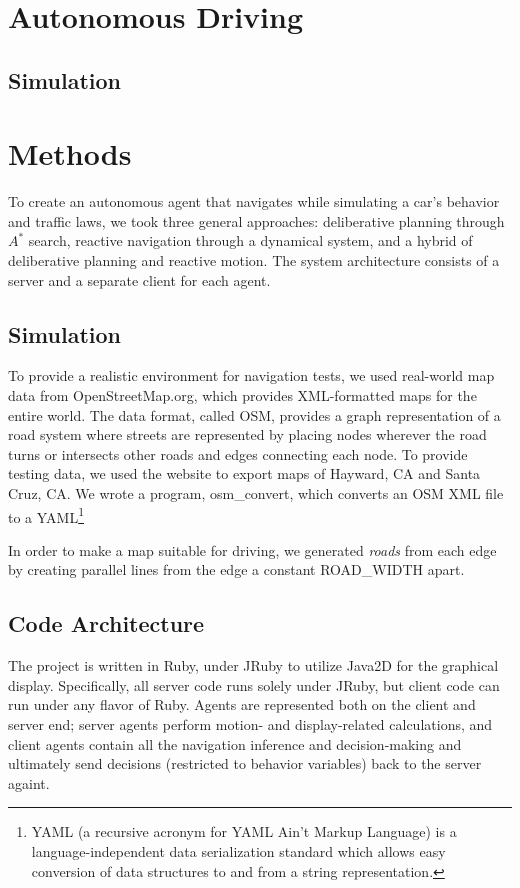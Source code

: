 \documentclass{article}
\begin{document}
\section{Autonomous Driving}

\subsection{Simulation}

\section{Methods}

To create an autonomous agent that navigates while simulating a car's behavior
and traffic laws, we took three general approaches: deliberative planning
through $A^*$ search, reactive navigation through a dynamical system, and a
hybrid of deliberative planning and reactive motion. The system architecture
consists of a server and a separate client for each agent.

\subsection{Simulation}
To provide a realistic environment for navigation tests, we used real-world map
data from OpenStreetMap.org, which provides XML-formatted maps for the entire
world. The data format, called OSM, provides a graph representation of a road
system where streets are represented by placing nodes wherever the road turns or
intersects other roads and edges connecting each node. To provide testing data,
we used the website to export maps of Hayward, CA and Santa Cruz, CA. We wrote a
program, osm\_convert, which converts an OSM XML file to a YAML\footnote{YAML (a
  recursive acronym for YAML Ain't Markup Language) is a language-independent
  data serialization standard which allows easy conversion of data structures to
  and from a string representation.}

In order to make a map
suitable for driving, we generated \textit{roads} from each edge by creating
parallel lines from the edge a constant ROAD\_WIDTH apart.

\subsection{Code Architecture}

The project is written in Ruby, under JRuby to utilize Java2D for the graphical
display. Specifically, all server code runs solely under JRuby, but client
code can run under any flavor of Ruby. Agents are represented both on the client
and server end; server agents perform motion- and display-related
calculations, and client agents contain all the navigation inference and
decision-making and ultimately send decisions (restricted to behavior variables)
back to the server againt.
\end{document}
